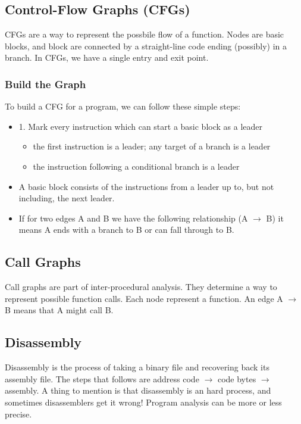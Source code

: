 \subsection{Control-Flow Graphs (CFGs)}

CFGs are a way to represent the possbile flow of a function. 
Nodes are basic blocks, and block are connected by a straight-line code ending (possibly) in a branch. In CFGs, we have a single entry and exit point.

\subsubsection{Build the Graph}

To build a CFG for a program, we can follow these simple steps: 
\begin{itemize}
    \item 1. Mark every instruction which can start a basic block as a leader
    \begin{itemize}
        \item the first instruction is a leader; any target of a branch is a leader
        \item the instruction following a conditional branch is a leader
    \end{itemize}
    \item A basic block consists of the instructions from a leader up to, but not
including, the next leader.
    \item If for two edges A and B we have the following relationship (A $\rightarrow$ B) it means A ends with a branch to B or can fall through to B. 
\end{itemize}

\subsection{Call Graphs}

Call graphs are part of inter-procedural analysis. They determine a way to represent possible function calls. Each node represent a function. An edge A $\rightarrow$ B means that A might call B. 

\subsection{Disassembly}

Disassembly is the process of taking a binary file and recovering back its assembly file. 
The steps that follows are address code $\rightarrow$ code bytes $\rightarrow$ assembly. 
A thing to mention is that disassembly is an hard process, and sometimes disassemblers get it wrong! 
Program analysis can be more or less precise. 

